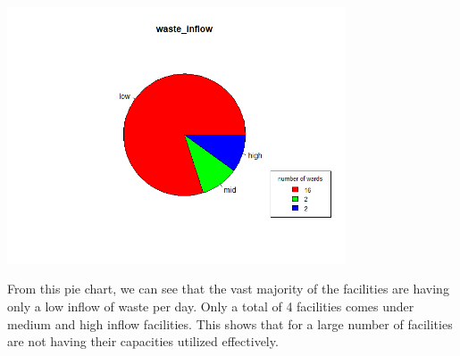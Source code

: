 \documentclass[12pt,a4paper]{report}
\begin{document}
\begin{justify}
	
	\centering
	\includegraphics[width=0.75\textwidth]{wi}
\end{justify}
\begin{justify}
	From this pie chart, we can see that the vast majority of the facilities are having only a low inflow of waste per day. Only a total of 4 facilities comes under medium and high inflow facilities. This shows that for a large number of facilities are not having their capacities utilized effectively.  

\end{justify}	
\end{document}
